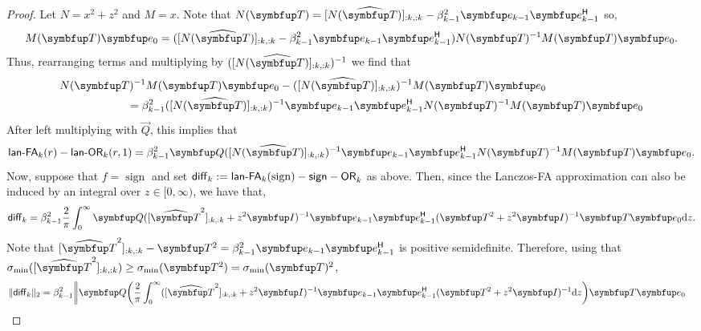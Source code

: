 \begin{proof}%
Let ${N} = x^2 + z^2$ and ${M} = x$.
Note that ${N}\mf{\vec{T}} = [{N}(\widehat{\vec{T}})]_{:k,:k} - \beta_{k-1}^2 \vec{e}_{k-1}\vec{e}_{k-1}^\cT$ so,
\begin{equation*}
    {M}\mf{\vec{T}} \vec{e}_0
    = ([{N}(\widehat{\vec{T}})]_{:k,:k} - \beta_{k-1}^2 \vec{e}_{k-1}\vec{e}_{k-1}^\cT){N}\mf{\vec{T}}^{-1} {M}\mf{\vec{T}} \vec{e}_0.
\end{equation*}
    Thus, rearranging terms and multiplying by $([{N}\mf{\widehat{\vec{T}}}]_{:k,:k})^{-1}$ we find that
\begin{align*}
    &{N}\mf{\vec{T}}^{-1} {M}\mf{\vec{T}} \vec{e}_0 - ([{N}(\widehat{\vec{T}})]_{:k,:k})^{-1} {M}\mf{\vec{T}} \vec{e}_0
    \\&\hspace{6em}= \beta_{k-1}^2 ([{N}(\widehat{\vec{T}})]_{:k,:k})^{-1} \vec{e}_{k-1}\vec{e}_{k-1}^\cT {N}\mf{\vec{T}}^{-1}{M}\mf{\vec{T}} \vec{e}_0
\end{align*}
After left multiplying with $\vec{Q}$, this implies that
\begin{equation*}
    \lan_k(r) - \lanopt_k(r,1)
    = \beta_{k-1}^2 \vec{Q} ([{N}(\widehat{\vec{T}})]_{:k,:k})^{-1} \vec{e}_{k-1}\vec{e}_{k-1}^\cT  {N}\mf{\vec{T}}^{-1}{M}\mf{\vec{T}} \vec{e}_0.
\end{equation*}
Now, suppose that $f = \operatorname{sign}$ and set $ \mathsf{diff}_k := \textup{\textsf{lan-FA}}_k(\operatorname{sign}) - \mathsf{sign-OR}_k$ as above.
Then, since the Lanczos-FA approximation can also be induced by an integral over $z\in[0,\infty)$, we have that,
\begin{equation*}
    \mathsf{diff}_k
    = \beta_{k-1}^2 
    \frac{2 }{\pi} \int_{0}^{\infty}
    \vec{Q} ([\widehat{\vec{T}}^2]_{:k,:k} + z^2 \vec{I})^{-1} \vec{e}_{k-1}\vec{e}_{k-1}^\cT (\vec{T}^2 + z^2 \vec{I})^{-1} \vec{T} \vec{e}_0 
    \d{z}.
\end{equation*}
Note that $[\widehat{\vec{T}}^2]_{:k,:k} - \vec{T}^2 = \beta_{k-1}^2 \vec{e}_{k-1} \vec{e}_{k-1}^\cT$ is positive semidefinite.
Therefore, using that $\sigma_{\textup{min}}([\widehat{\vec{T}}^2]_{:k,:k}) \geq \sigma_{\textup{min}}(\vec{T}^2) = \sigma_{\textup{min}}\mf{\vec{T}}^2$,
\begin{align*}
    \| \mathsf{diff}_k \|_2
    &
    = \beta_{k-1}^2 
     \bigg\| \vec{Q} \bigg( \frac{2 }{\pi} \int_{0}^{\infty}
    ([\widehat{\vec{T}}^2]_{:k,:k} + z^2 \vec{I})^{-1} \vec{e}_{k-1}\vec{e}_{k-1}^\cT (\vec{T}^2 + z^2 \vec{I})^{-1} \d{z} \bigg)  \vec{T} \vec{e}_0 

\end{align*}
\end{proof}
